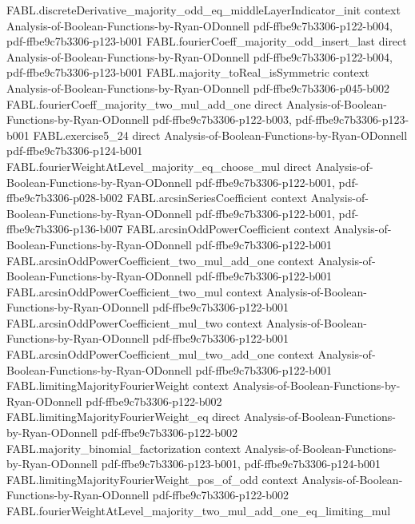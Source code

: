 \begin{theorem}
\proofstep
  {FABL.discreteDerivative_majority_odd_eq_middleLayerIndicator_init}
  {context}
  {Analysis-of-Boolean-Functions-by-Ryan-ODonnell}
  {pdf-ffbe9c7b3306-p122-b004,
    pdf-ffbe9c7b3306-p123-b001}
\proofstep
  {FABL.fourierCoeff_majority_odd_insert_last}
  {direct}
  {Analysis-of-Boolean-Functions-by-Ryan-ODonnell}
  {pdf-ffbe9c7b3306-p122-b004,
    pdf-ffbe9c7b3306-p123-b001}
\proofstep
  {FABL.majority_toReal_isSymmetric}
  {context}
  {Analysis-of-Boolean-Functions-by-Ryan-ODonnell}
  {pdf-ffbe9c7b3306-p045-b002}
\proofstep
  {FABL.fourierCoeff_majority_two_mul_add_one}
  {direct}
  {Analysis-of-Boolean-Functions-by-Ryan-ODonnell}
  {pdf-ffbe9c7b3306-p122-b003,
    pdf-ffbe9c7b3306-p123-b001}
\proofstep
  {FABL.exercise5_24}
  {direct}
  {Analysis-of-Boolean-Functions-by-Ryan-ODonnell}
  {pdf-ffbe9c7b3306-p124-b001}
\proofstep
  {FABL.fourierWeightAtLevel_majority_eq_choose_mul}
  {direct}
  {Analysis-of-Boolean-Functions-by-Ryan-ODonnell}
  {pdf-ffbe9c7b3306-p122-b001,
    pdf-ffbe9c7b3306-p028-b002}
\proofstep
  {FABL.arcsinSeriesCoefficient}
  {context}
  {Analysis-of-Boolean-Functions-by-Ryan-ODonnell}
  {pdf-ffbe9c7b3306-p122-b001,
    pdf-ffbe9c7b3306-p136-b007}
\proofstep
  {FABL.arcsinOddPowerCoefficient}
  {context}
  {Analysis-of-Boolean-Functions-by-Ryan-ODonnell}
  {pdf-ffbe9c7b3306-p122-b001}
\proofstep
  {FABL.arcsinOddPowerCoefficient_two_mul_add_one}
  {context}
  {Analysis-of-Boolean-Functions-by-Ryan-ODonnell}
  {pdf-ffbe9c7b3306-p122-b001}
\proofstep
  {FABL.arcsinOddPowerCoefficient_two_mul}
  {context}
  {Analysis-of-Boolean-Functions-by-Ryan-ODonnell}
  {pdf-ffbe9c7b3306-p122-b001}
\proofstep
  {FABL.arcsinOddPowerCoefficient_mul_two}
  {context}
  {Analysis-of-Boolean-Functions-by-Ryan-ODonnell}
  {pdf-ffbe9c7b3306-p122-b001}
\proofstep
  {FABL.arcsinOddPowerCoefficient_mul_two_add_one}
  {context}
  {Analysis-of-Boolean-Functions-by-Ryan-ODonnell}
  {pdf-ffbe9c7b3306-p122-b001}
\proofstep
  {FABL.limitingMajorityFourierWeight}
  {context}
  {Analysis-of-Boolean-Functions-by-Ryan-ODonnell}
  {pdf-ffbe9c7b3306-p122-b002}
\proofstep
  {FABL.limitingMajorityFourierWeight_eq}
  {direct}
  {Analysis-of-Boolean-Functions-by-Ryan-ODonnell}
  {pdf-ffbe9c7b3306-p122-b002}
\proofstep
  {FABL.majority_binomial_factorization}
  {context}
  {Analysis-of-Boolean-Functions-by-Ryan-ODonnell}
  {pdf-ffbe9c7b3306-p123-b001,
    pdf-ffbe9c7b3306-p124-b001}
\proofstep
  {FABL.limitingMajorityFourierWeight_pos_of_odd}
  {context}
  {Analysis-of-Boolean-Functions-by-Ryan-ODonnell}
  {pdf-ffbe9c7b3306-p122-b002}
\proofstep
  {FABL.fourierWeightAtLevel_majority_two_mul_add_one_eq_limiting_mul}

\end{theorem}
